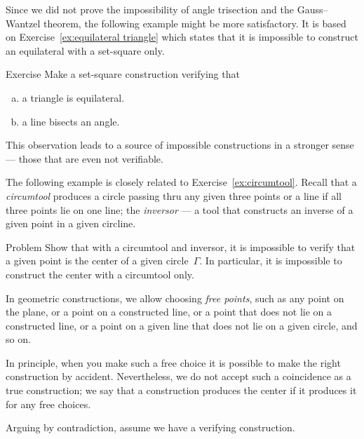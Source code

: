 Since we did not prove the impossibility of angle trisection and the Gauss--Wantzel theorem, the following example might be more satisfactory.
It is based on Exercise~\ref{ex:equilateral triangle} which states that it is impossible to construct an equilateral with a set-square only.

\begin{thm}{Exercise}\label{ex:equilateral triangle-verify}
Make a set-square construction verifying that 
\begin{enumerate}[(a)]
\item\label{ex:verify:triangle} a triangle is equilateral.
\item\label{ex:verify:bisector} a line bisects an angle.
\end{enumerate}
\end{thm}

This observation leads to a source of impossible constructions in a stronger sense --- those that are even not verifiable.

The following example is closely related to Exercise~\ref{ex:circumtool}.
Recall that a \emph{circumtool} produces a circle passing thru any given three points
or a line if all three points lie on one line;
the \emph{inversor} --- a tool that constructs an inverse of a given point in a given circline.


\begin{thm}{Problem}\label{prob:center-inversor+circumtool}
Show that with a circumtool and inversor,
it is impossible to verify that a given point is the center of a given circle~$\Gamma$.
In particular, it is impossible to construct the center with a circumtool only.
\end{thm}

In geometric constructions, we allow choosing \emph{free points}, such as any point on the plane, or a point on a constructed line, or a point that does not lie on a constructed line, or a point on a given line that does not lie on a given circle, and so on.

In principle, when you make such a free choice it is possible to make the right construction by accident.
Nevertheless, we do not accept such a coincidence as a true construction; 
we say that a construction produces the center if it produces it for any free choices.


\label{page:solution-for-ex:circumtool}
Arguing by contradiction, 
assume we have a verifying construction. 


